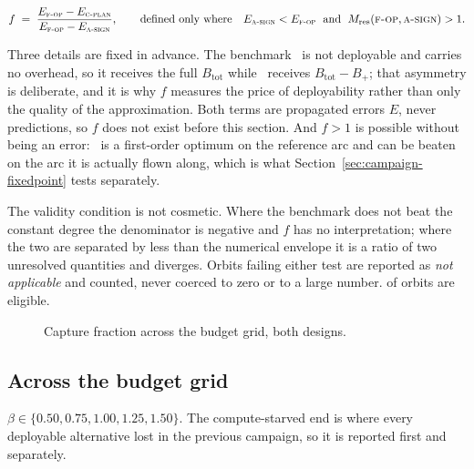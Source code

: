 \begin{equation}
  f \;=\; \frac{E_{\textsc{f-op}}-E_{\textsc{c-plan}}}{E_{\textsc{f-op}}-E_{\textsc{a-sign}}} ,
  \qquad\text{defined only where}\quad
  E_{\textsc{a-sign}} < E_{\textsc{f-op}}
  \;\text{ and }\;
  M_{\mathrm{res}}(\textsc{f-op},\textsc{a-sign}) > 1 .
  \label{eq:capture}
\end{equation}

Three details are fixed in advance. The benchmark \Asign\ is not deployable and
carries no overhead, so it receives the full $B_{\mathrm{tot}}$ while \Cplan\ receives $B_{\mathrm{tot}}-B_+$; that asymmetry is deliberate, and it is why
$f$ measures the price of deployability rather than only the quality of the
approximation. Both terms are propagated errors $E$, never predictions, so $f$
does not exist before this section. And $f>1$ is possible without being an
error: \Asign\ is a first-order optimum on the reference arc and can be beaten
on the arc it is actually flown along, which is what
Section~\ref{sec:campaign-fixedpoint} tests separately.

The validity condition is not cosmetic. Where the benchmark does not beat the constant
degree the denominator is negative and $f$ has no interpretation; where the two
are separated by less than the numerical envelope it is a ratio of two
unresolved quantities and diverges. Orbits failing either test are reported as
\emph{not applicable} and counted, never coerced to zero or to a large number.
 of  orbits are eligible. 

\begin{figure}[!tbp]
  \centering
  \caption{Capture fraction across the budget grid, both designs.}
  \label{fig:capture}
\end{figure}

\subsection{Across the budget grid}

 $\beta\in\{0.50,0.75,1.00,1.25,1.50\}$. The
compute-starved end is where every deployable alternative lost in the previous
campaign, so it is reported first and separately. 


